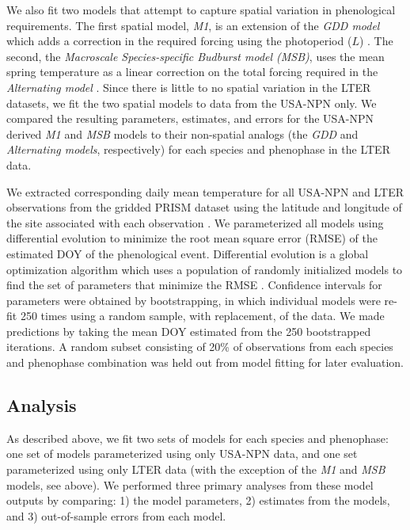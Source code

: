 \documentclass[fleqn,12pt,lineno]{article}
\begin{document}
We also fit two models that attempt to capture spatial variation in phenological requirements. The first spatial model, \textit{M1}, is an extension of the \textit{GDD model} which adds a correction in the required forcing using the photoperiod ($L$) \citep{blumel2012}. The second, the \textit{Macroscale Species-specific Budburst model (MSB)}, uses the mean spring temperature as a linear correction on the total forcing required in the \textit{Alternating model} \citep{jeong2013}. Since there is little to no spatial variation in the LTER datasets, we fit the two spatial models to data from the USA-NPN only. We compared the resulting parameters, estimates, and errors for the USA-NPN derived \textit{M1} and \textit{MSB} models to their non-spatial analogs (the \textit{GDD} and \textit{Alternating models}, respectively) for each species and phenophase in the LTER data.  

We extracted corresponding daily mean temperature for all USA-NPN and LTER observations from the gridded PRISM dataset using the latitude and longitude of the site associated with each observation \citep{prismdata}. We parameterized all models using differential evolution to minimize the root mean square error (RMSE) of the estimated DOY of the phenological event. Differential evolution is a global optimization algorithm which uses a population of randomly initialized models to find the set of parameters that minimize the RMSE \citep{storn1997}. Confidence intervals for parameters were obtained by bootstrapping, in which individual models were re-fit 250 times using a random sample, with replacement, of the data. We made predictions by taking the mean DOY estimated from the 250 bootstrapped iterations. A random subset consisting of 20\% of observations from each species and phenophase combination was held out from model fitting for later evaluation.

\subsection*{Analysis}

As described above, we fit two sets of models for each species and phenophase: one set of models parameterized using only USA-NPN data, and one set parameterized using only LTER data (with the exception of the \textit{M1} and \textit{MSB} models, see above). We performed three primary analyses from these model outputs by comparing: 1) the model parameters, 2) estimates from the models, and 3) out-of-sample errors from each model.
\end{document}
